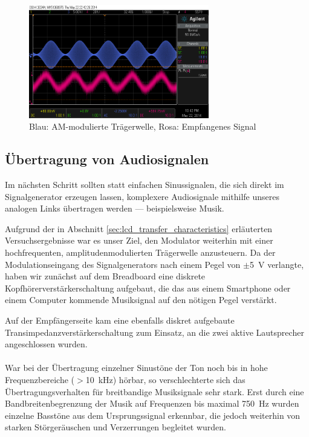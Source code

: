 \documentclass[12pt,a4paper]{article}
\begin{document}
\begin{figure}[H]
  \centering
    \includegraphics[width=0.7\textwidth]{../measurements/20140522_sweep/scope_1.png}
  \caption{Blau: AM-modulierte Trägerwelle, Rosa: Empfangenes Signal}
  \label{fig:amplitude_modulation}
\end{figure}


\subsection{Übertragung von Audiosignalen}

Im nächsten Schritt sollten statt einfachen Sinussignalen, die sich direkt im Signalgenerator erzeugen lassen, komplexere Audiosignale mithilfe unseres analogen Links übertragen werden --- beispielsweise Musik.

Aufgrund der in Abschnitt \ref{sec:lcd_transfer_characteristics} erläuterten Versuchsergebnisse war es unser Ziel, den Modulator weiterhin mit einer hochfrequenten, amplitudenmodulierten Trägerwelle anzusteuern. Da der Modulationseingang des Signalgenerators nach einem Pegel von $\pm$\SI{5}{\volt} verlangte, haben wir zunächst auf dem Breadboard eine diskrete Kopfhörerverstärkerschaltung aufgebaut, die das aus einem Smartphone oder einem Computer kommende Musiksignal auf den nötigen Pegel verstärkt.

Auf der Empfängerseite kam eine ebenfalls diskret aufgebaute Transimpedanzverstärkerschaltung zum Einsatz, an die zwei aktive Lautsprecher angeschlossen wurden.
\\\\
War bei der Übertragung einzelner Sinustöne der Ton noch bis in hohe Frequenzbereiche ($>$\SI{10}{\kilo\hertz}) hörbar, so verschlechterte sich das Übertragungsverhalten für breitbandige Musiksignale sehr stark. Erst durch eine Bandbreitenbegrenzung der Musik auf Frequenzen bis maximal \SI{750}{\hertz} wurden einzelne Basstöne aus dem Ursprungssignal erkennbar, die jedoch weiterhin von starken Störgeräuschen und Verzerrungen begleitet wurden.
\end{document}
